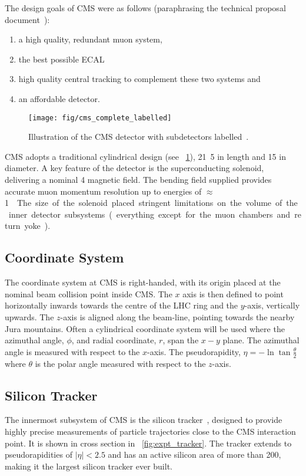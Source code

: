 The design goals of CMS were as follows (paraphrasing the technical proposal
document~\cite{cms_technical_proposal}):
\begin{enumerate}
\item a high quality, redundant muon system,
\item the best possible \ac{ECAL}
\item high quality central tracking to complement these two systems and
\item an affordable detector.
\end{enumerate}

\begin{figure}[h!]
\centering
\texttt{[image: fig/cms\_complete\_labelled]}
\caption[Illustration of the \acs{CMS} detector]{Illustration of the \ac{CMS}
  detector with subdetectors labelled~\cite{cms_jinst}.}
\label{fig:expt_cms}
\end{figure}

\ac{CMS} adopts a traditional cylindrical design (see
\fig~\ref{fig:expt_cms}), \unit{21.5}{\metre} in length and
\unit{15}{\metre} in diameter. A key feature of the detector is the
superconducting solenoid, delivering a nominal \unit{4}{\tesla}
magnetic field. The bending field supplied provides accurate muon
momentum resolution up to energies of \unit{$\approx$ 1}{\TeV}. The
size of the solenoid placed stringent limitations on the volume of the
inner detector subsystems (everything except for the muon chambers and
return yoke).

\subsection{Coordinate System}
The coordinate system at \ac{CMS} is right-handed, with its origin placed at the
nominal beam collision point inside \ac{CMS}. The $x$ axis is then defined to
point horizontally inwards towards the centre of the \ac{LHC} ring and the
$y$-axis, vertically upwards. The $z$-axis is aligned along the beam-line,
pointing towards the nearby Jura mountains. Often a cylindrical coordinate
system will be used where the azimuthal angle, $\phi$, and radial
coordinate, $r$, span the $x-y$ plane. The azimuthal angle is measured with
respect to the $x$-axis. The pseudorapidity, $\eta = - \ln \tan
\frac{\theta}{2}$ where $\theta$ is the polar angle measured with respect to the
$z$-axis.

\subsection{Silicon Tracker}
The innermost subsystem of \ac{CMS} is the silicon tracker~\cite{tracker_paper},
designed to provide highly precise measurements of particle trajectories close
to the CMS interaction point. It is shown in cross section in
\fig~\ref{fig:expt_tracker}. The tracker extends to pseudorapidities of
$|\eta|<2.5$ and has an active silicon area of more than
\unit{200}{\metre\squared}, making it the largest silicon tracker ever built.

